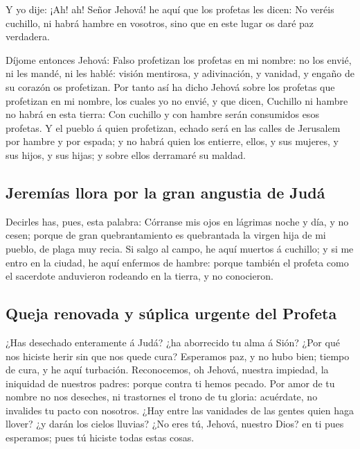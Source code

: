  Y yo dije: ¡Ah! ah! Señor Jehová! he aquí que los
profetas les dicen: No veréis cuchillo, ni habrá hambre en vosotros,
sino que en este lugar os daré paz verdadera.

 Díjome entonces Jehová: Falso profetizan los profetas en
mi nombre: no los envié, ni les mandé, ni les hablé: visión mentirosa, y
adivinación, y vanidad, y engaño de su corazón os profetizan.
 Por tanto así ha dicho Jehová sobre los profetas que
profetizan en mi nombre, los cuales yo no envié, y que dicen, Cuchillo
ni hambre no habrá en esta tierra: Con cuchillo y con hambre serán
consumidos esos profetas.  Y el pueblo á quien
profetizan, echado será en las calles de Jerusalem por hambre y por
espada; y no habrá quien los entierre, ellos, y sus mujeres, y sus
hijos, y sus hijas; y sobre ellos derramaré su maldad.

\hypertarget{jeremuxedas-llora-por-la-gran-angustia-de-juduxe1}{%
\subsection{Jeremías llora por la gran angustia de
Judá}\label{jeremuxedas-llora-por-la-gran-angustia-de-juduxe1}}

 Decirles has, pues, esta palabra: Córranse mis ojos en
lágrimas noche y día, y no cesen; porque de gran quebrantamiento es
quebrantada la virgen hija de mi pueblo, de plaga muy recia.
 Si salgo al campo, he aquí muertos á cuchillo; y si me
entro en la ciudad, he aquí enfermos de hambre: porque también el
profeta como el sacerdote anduvieron rodeando en la tierra, y no
conocieron.

\hypertarget{queja-renovada-y-suxfaplica-urgente-del-profeta}{%
\subsection{Queja renovada y súplica urgente del
Profeta}\label{queja-renovada-y-suxfaplica-urgente-del-profeta}}

 ¿Has desechado enteramente á Judá? ¿ha aborrecido tu
alma á Sión? ¿Por qué nos hiciste herir sin que nos quede cura?
Esperamos paz, y no hubo bien; tiempo de cura, y he aquí turbación.
 Reconocemos, oh Jehová, nuestra impiedad, la iniquidad
de nuestros padres: porque contra ti hemos pecado.  Por
amor de tu nombre no nos deseches, ni trastornes el trono de tu gloria:
acuérdate, no invalides tu pacto con nosotros.  ¿Hay
entre las vanidades de las gentes quien haga llover? ¿y darán los cielos
lluvias? ¿No eres tú, Jehová, nuestro Dios? en ti pues esperamos; pues
tú hiciste todas estas cosas.

